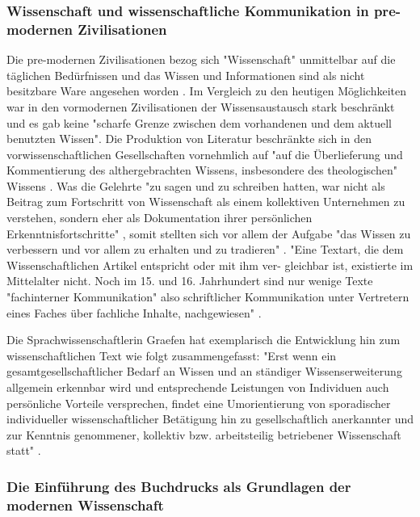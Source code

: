 \subsubsection{Wissenschaft und wissenschaftliche Kommunikation in pre-modernen Zivilisationen}

Die pre-modernen Zivilisationen bezog sich "Wissenschaft" unmittelbar auf die täglichen Bedürfnissen und das Wissen und Informationen sind als nicht besitzbare Ware angesehen worden\cite{cite:18} \cite{steiner_1998_autorenhonorar}. Im Vergleich zu den heutigen Möglichkeiten war in den vormodernen Zivilisationen der Wissensaustausch stark beschränkt \cite{cite:17c} und es gab keine "scharfe Grenze zwischen dem vorhandenen und dem aktuell benutzten Wissen"\cite{Luhmann1998}. Die Produktion von Literatur beschränkte sich in den vorwissenschaftlichen Gesellschaften vornehmlich auf "auf die Überlieferung und Kommentierung des althergebrachten Wissens, insbesondere des theologischen" Wissens \cite{steiner_1998_autorenhonorar}. Was die Gelehrte "zu sagen und zu schreiben hatten, war nicht als Beitrag zum Fortschritt von Wissenschaft als einem kollektiven Unternehmen zu verstehen, sondern eher als Dokumentation ihrer persönlichen Erkenntnisfortschritte" \cite{graefen2007_wissenschaftliche_artikel}, somit stellten sich vor allem der Aufgabe "das Wissen zu verbessern und vor allem zu erhalten und zu tradieren" \cite{Luhmann1998}. "Eine Textart, die dem Wissenschaftlichen Artikel entspricht oder mit ihm ver- gleichbar ist, existierte im Mittelalter nicht. Noch im 15. und 16. Jahrhundert sind nur wenige Texte "fachinterner Kommunikation" also schriftlicher Kommunikation unter Vertretern eines Faches über fachliche Inhalte, nachgewiesen" \cite{graefen2007_wissenschaftliche_artikel}.

Die Sprachwissenschaftlerin Graefen hat exemplarisch die Entwicklung hin zum wissenschaftlichen Text wie folgt zusammengefasst: "Erst wenn ein gesamtgesellschaftlicher Bedarf an Wissen und an ständiger Wissenserweiterung allgemein erkennbar wird und entsprechende Leistungen von Individuen auch persönliche Vorteile versprechen, findet eine Umorientierung von sporadischer individueller wissenschaftlicher Betätigung hin zu gesellschaftlich anerkannter und zur Kenntnis genommener, kollektiv bzw. arbeitsteilig betriebener Wissenschaft statt" \cite{graefen2007_wissenschaftliche_artikel}.

\subsubsection{Die Einführung des Buchdrucks als Grundlagen der modernen Wissenschaft}

